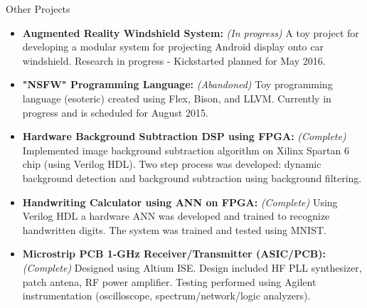 \begin{rSection}{Other Projects}
  \begin{itemize}
  \item {\bf Augmented Reality Windshield System: } {\it (In progress)} A toy project for developing a modular system for projecting Android display onto car windshield. Research in progress - Kickstarted planned for May 2016.
  \item {\bf "NSFW" Programming Language:} {\it (Abandoned)} Toy programming language (esoteric) created using Flex, Bison, and LLVM. Currently in progress and is scheduled for August 2015.
  \item {\bf Hardware Background Subtraction DSP using FPGA:} {\it (Complete)} Implemented image background subtraction algorithm on Xilinx Spartan 6 chip (using Verilog HDL). Two step process was developed: dynamic background detection and background subtraction using background filtering.
  \item {\bf Handwriting Calculator using ANN on FPGA:} {\it (Complete)} Using Verilog HDL a hardware ANN was developed and trained to recognize handwritten digits. The system was trained and tested using MNIST.
  \item {\bf Microstrip PCB 1-GHz Receiver/Transmitter (ASIC/PCB):} {\it (Complete)} Designed using Altium ISE. Design included HF PLL synthesizer, patch antena, RF power amplifier. Testing performed using Agilent instrumentation (oscilloscope, spectrum/network/logic analyzers).
  \end{itemize}
\end{rSection}
